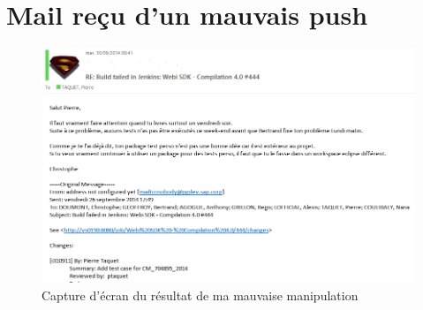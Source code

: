 \chapter{Mail re\c{c}u d'un mauvais push}\label{annexe:crashedBuildBecauseOfMe}


	\begin{figure}[!h]
  \centering
      \includegraphics[width=\textwidth]{images/crashedBuildBecauseOfMe.png}
  \caption{Capture d'\'{e}cran du r\'{e}sultat de ma mauvaise manipulation}
\end{figure}
